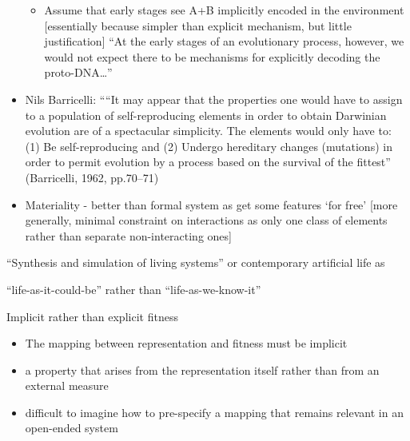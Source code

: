 \begin{itemize}
\begin{itemize}
	      	\item
	      	      		
	      	      Assume that early stages see A+B implicitly encoded in the
	      	      environment {[}essentially because simpler than explicit mechanism,
	      	      but little justification{]} ``At the early stages of an evolutionary
	      	      process, however, we would not expect there to be mechanisms for
	      	      explicitly decoding the proto-DNA\ldots{}''
	      	      		
	      \end{itemize}
	\item
	      	
	      Nils Barricelli: ````It may appear that the properties one would have
	      to assign to a population of self-reproducing elements in order to
	      obtain Darwinian evolution are of a spectacular simplicity. The
	      elements would only have to: (1) Be self-reproducing and (2) Undergo
	      hereditary changes (mutations) in order to permit evolution by a
	      process based on the survival of the fittest'' (Barricelli, 1962,
	      pp.70--71)
	      	
	\item
	      	
	      Materiality - better than formal system as get some features `for
	      free' {[}more generally, minimal constraint on interactions as only
	      one class of elements rather than separate non-interacting ones{]}
	      	
\end{itemize}


``Synthesis and simulation of living systems'' or contemporary artificial life as 

``life-as-it-could-be'' rather than ``life-as-we-know-it'' \autocite{Langton1989}

Implicit rather than explicit fitness

\begin{itemize}
	\item
	      The mapping between representation and fitness must be implicit
	\item
	      a property that arises from the representation itself rather than from
	      an external measure
	\item
	      difficult to imagine how to pre-specify a mapping that remains
	      relevant in an open-ended system
\end{itemize}

